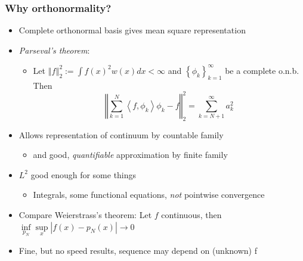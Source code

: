 \documentclass[bigger]{beamer}
\begin{document}
\begin{frame}%

\frametitle{Why orthonormality?}

\begin{itemize}

\item Complete orthonormal basis gives mean square representation
\item \emph{Parseval's theorem}: 
\begin{itemize}
\item Let $\left\Vert f \right\Vert_{2}^{2}:= \int f(x)^2w(x)dx<\infty$ and $\left\{\phi_{k}\right\}_{k=1}^{\infty}$ be a complete o.n.b. Then
\begin{equation*}
\left\Vert\sum_{k=1}^{N}\left\langle f,\phi_{k}\right\rangle\phi_{k}-f\right\Vert_{2}^{2}=\sum_{k=N+1}^{\infty}a_k^2
\end{equation*}
\end{itemize}
\item Allows representation of continuum by countable family
\begin{itemize}
\item and good, \emph{quantifiable} approximation by finite family
\end{itemize}
\item $L^2$ good enough for some things
\begin{itemize}
\item Integrals, some functional equations, \emph{not} pointwise convergence
\end{itemize}
\item Compare Weierstrass's theorem: Let $f$ continuous, then $\underset{p_N}{\inf}\underset{x}{\sup}|f(x)-p_N(x)|\to 0$
\item Fine, but no speed results, sequence may depend on (unknown) f



\end{itemize}


\end{frame}%
\end{document}
